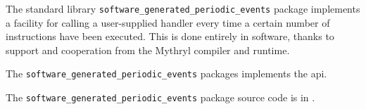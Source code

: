 
The standard library {\tt software\_generated\_periodic\_events} package implements a facility for 
calling a user-supplied handler every time a certain number of instructions have been executed.  This 
is done entirely in software, thanks to support and cooperation from the Mythryl compiler and runtime. 

The {\tt software\_generated\_periodic\_events} packages implements the  api.

The {\tt software\_generated\_periodic\_events} package source code is in .


